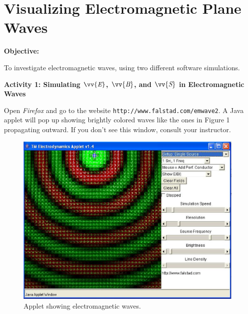 \section{Visualizing Electromagnetic Plane Waves}

\makelabheader %

\bigskip
\textbf{Objective:} 


To investigate electromagnetic waves, using two different software simulations.


\bigskip

\textbf{Activity 1: Simulating $\vv{\textit{E}}$, $\vv{\textit{B}}$, and $\vv{\textit{S}}$ in Electromagnetic Waves}


Open \textit{Firefox} and go to the website
\verb!http://www.falstad.com/emwave2!. A Java applet will pop up showing
brightly colored waves like the ones in Figure 1 propagating outward. 
If you don't see this window, consult your instructor.
\begin{figure}[hbt]
\begin{center}
\includegraphics[width=6.0in]{plane_waves/emwaves1.eps}
\caption{Applet showing electromagnetic waves.}
\end{center}
\end{figure}

